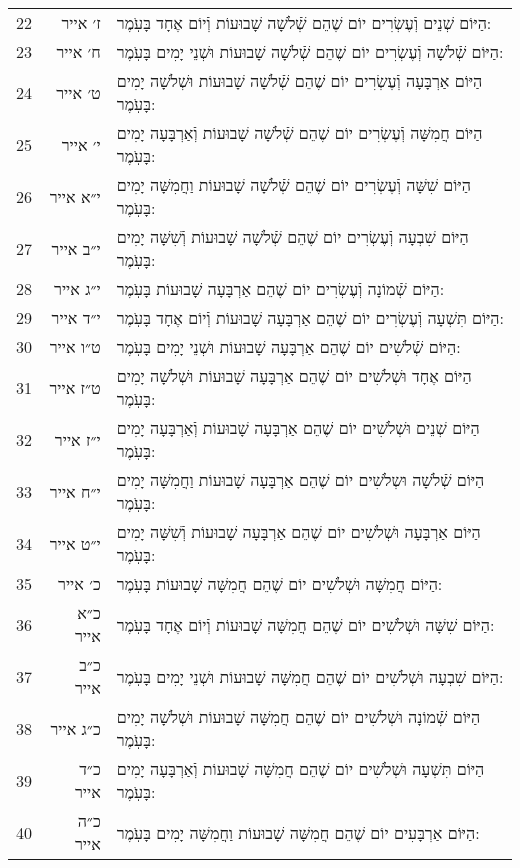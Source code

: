 \documentclass[twoside, openany, parskip=half, 11pt]{book}
\begin{document}
\begin{scriptsize}
\begin{longtable}{ l | r | p{} }
		22 & ז׳ אייר & הַיּוֹם שְׁנֵים וְֿעֶשְׂרִים יוֹם שֶׁהֵם שְֿׁלֹשָׁה שָׁבוּעוֹת וְֿיוֹם אֶחָד בָּעֹֽמֶר: \\
		23 & ח׳ אייר & הַיּוֹם שְֿׁלֹשָׁה וְֿעֶשְׂרִים יוֹם שֶׁהֵם שְֿׁלֹשָׁה שָׁבוּעוֹת וּשְׁנֵי יָמִים בָּעֹֽמֶר: \\
		24 & ט׳ אייר & הַיּוֹם אַרְבָּעָה וְֿעֶשְׂרִים יוֹם שֶׁהֵם שְֿׁלֹשָׁה שָׁבוּעוֹת וּשְׁלֹשָׁה יָמִים בָּעֹֽמֶר: \\
		25 & י׳ אייר & הַיּוֹם חֲמִשָּׁה וְֿעֶשְׂרִים יוֹם שֶׁהֵם שְֿׁלֹשָׁה שָׁבוּעוֹת וְֿאַרְבָּעָה יָמִים בָּעֹֽמֶר: \\
		26 & י״א אייר & הַיּוֹם שִׁשָּׁה וְֿעֶשְׂרִים יוֹם שֶׁהֵם שְֿׁלֹשָׁה שָׁבוּעוֹת וַחֲמִשָּׁה יָמִים בָּעֹֽמֶר: \\
		27 & י״ב אייר & הַיּוֹם שִׁבְעָה וְֿעֶשְׂרִים יוֹם שֶׁהֵם שְֿׁלֹשָׁה שָׁבוּעוֹת וְֿשִׁשָּׁה יָמִים בָּעֹֽמֶר: \\
		28 & י״ג אייר & הַיּוֹם שְֿׁמוֹנָה וְֿעֶשְׂרִים יוֹם שֶׁהֵם אַרְבָּעָה שָׁבוּעוֹת בָּעֹֽמֶר: \\
		29 & י״ד אייר & הַיּוֹם תִּשְׁעָה וְֿעֶשְׂרִים יוֹם שֶׁהֵם אַרְבָּעָה שָׁבוּעוֹת וְֿיוֹם אֶחָד בָּעֹֽמֶר: \\
		30 & ט״ו אייר & הַיּוֹם שְֿׁלֹשִׁים יוֹם שֶׁהֵם אַרְבָּעָה שָׁבוּעוֹת וּשְׁנֵי יָמִים בָּעֹֽמֶר: \\
		31 & ט״ז אייר & הַיּוֹם אֶחָד וּשְׁלֹשִׁים יוֹם שֶׁהֵם אַרְבָּעָה שָׁבוּעוֹת וּשְׁלֹשָׁה יָמִים בָּעֹֽמֶר: \\
		32 & י״ז אייר & הַיּוֹם שְׁנֵים וּשְׁלֹשִׁים יוֹם שֶׁהֵם אַרְבָּעָה שָׁבוּעוֹת וְֿאַרְבָּעָה יָמִים בָּעֹֽמֶר: \\
		33 & י״ח אייר & הַיּוֹם שְֿׁלֹשָׁה וּשְלֹשִׁים יוֹם שֶׁהֵם אַרְבָּעָה שָׁבוּעוֹת וַחֲמִשָּׁה יָמִים בָּעֹֽמֶר: \\
		34 & י״ט אייר & הַיּוֹם אַרְבָּעָה וּשְׁלֹשִׁים יוֹם שֶׁהֵם אַרְבָּעָה שָׁבוּעוֹת וְֿשִׁשָּׁה יָמִים בָּעֹֽמֶר: \\
		35 & כ׳ אייר & הַיּוֹם חֲמִשָּׁה וּשְׁלֹשִׁים יוֹם שֶׁהֵם חֲמִשָּׁה שָׁבוּעוֹת בָּעֹֽמֶר: \\
		36 & כ״א אייר & הַיּוֹם שִׁשָּׁה וּשְׁלֹשִׁים יוֹם שֶׁהֵם חֲמִשָּׁה שָׁבוּעוֹת וְֿיוֹם אֶחָד בָּעֹֽמֶר: \\
		37 & כ״ב אייר & הַיּוֹם שִׁבְעָה וּשְׁלֹשִׁים יוֹם שֶׁהֵם חֲמִשָּׁה שָׁבוּעוֹת וּשְׁנֵי יָמִים בָּעֹֽמֶר: \\
		38 & כ״ג אייר & הַיּוֹם שְֿׁמוֹנָה וּשְׁלֹשִׁים יוֹם שֶׁהֵם חֲמִשָּׁה שָׁבוּעוֹת וּשְׁלֹשָׁה יָמִים בָּעֹֽמֶר: \\
		39 & כ״ד אייר & הַיּוֹם תִּשְׁעָה וּשְׁלֹשִׁים יוֹם שֶׁהֵם חֲמִשָּׁה שָׁבוּעוֹת וְֿאַרְבָּעָה יָמִים בָּעֹֽמֶר: \\
		40 & כ״ה אייר & הַיּוֹם אַרְבָּעִים יוֹם שֶׁהֵם חֲמִשָּׁה שָׁבוּעוֹת וַחֲמִשָּׁה יָמִים בָּעֹֽמֶר: \\

\end{longtable}
\end{scriptsize}
\end{document}
